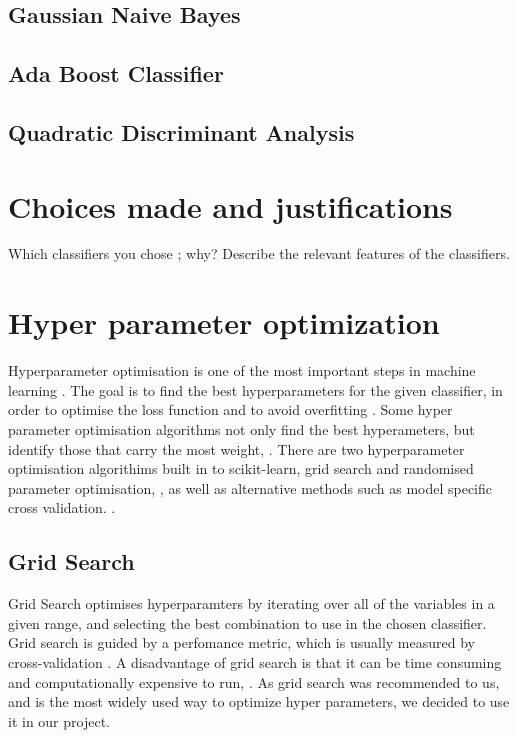 \documentclass{article}
\begin{document}
	\subsection{Gaussian Naive Bayes}
	
	\subsection{Ada Boost Classifier}
	
	\subsection{Quadratic Discriminant Analysis}

\section{Choices made and justifications}
	Which classifiers you chose ; why?  
	Describe the relevant features of the classifiers.

\newpage
\section{Hyper parameter optimization}

	Hyperparameter optimisation is one of the most important steps in machine learning \cite{bardenet}. The goal is to find the best hyperparameters for the given classifier, in order to optimise the loss function and to avoid overfitting \cite{Bergstra}. Some hyper parameter optimisation algorithms not only find the best hyperameters, but identify those that carry the most weight, \cite{Bergstra}.
	There are two hyperparameter optimisation algorithims built in to scikit-learn, grid search and randomised parameter optimisation, \cite{gridsearch}, as well as alternative methods such as model specific cross validation.   \cite{HyperparameterOptimisationWiki}.  
	
	\subsection{Grid Search}
	
		Grid Search optimises hyperparamters by iterating over all of the variables in a given range, and selecting the best combination to use in the chosen classifier. Grid search is guided by a perfomance metric, which is usually measured by cross-validation \cite{HyperparameterOptimisationWiki}. A disadvantage of grid search is that it can be time consuming and computationally expensive to run, \cite{HyperparameterOptimisationWiki}.
		As grid search was recommended to us, and is the most widely used way to optimize hyper parameters, we decided to use it in our project.
		
\end{document}
